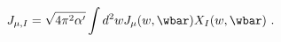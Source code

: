 \begin{equation}
      J_{\mu, I}=  \sqrt{4\pi^2\alpha'}\int d^2 w J_\mu (w,\wbar ) X_I(w,\wbar ) \ .
\end{equation}

